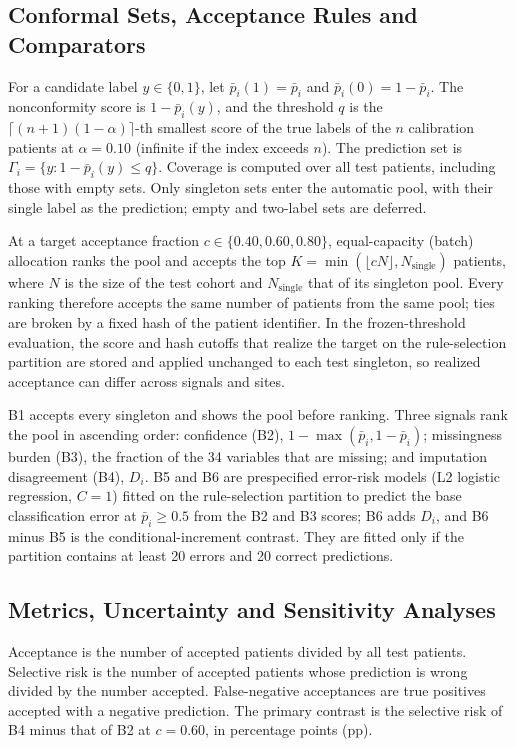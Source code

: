 \documentclass[conference]{IEEEtran}
\newcommand{\pmean}{\bar{p}}
\begin{document}
\subsection{Conformal Sets, Acceptance Rules and Comparators}
For a candidate label $y\in\{0,1\}$, let $\pmean_i(1)=\pmean_i$ and $\pmean_i(0)=1-\pmean_i$. The nonconformity score is $1-\pmean_i(y)$, and the threshold $q$ is the $\lceil (n+1)(1-\alpha)\rceil$-th smallest score of the true labels of the $n$ calibration patients at $\alpha=0.10$ (infinite if the index exceeds $n$). The prediction set is $\Gamma_i=\{y: 1-\pmean_i(y)\le q\}$. Coverage is computed over all test patients, including those with empty sets. Only singleton sets enter the automatic pool, with their single label as the prediction; empty and two-label sets are deferred.

At a target acceptance fraction $c\in\{0.40, 0.60, 0.80\}$, equal-capacity (batch) allocation ranks the pool and accepts the top $K=\min(\lfloor cN\rfloor, N_{\mathrm{single}})$ patients, where $N$ is the size of the test cohort and $N_{\mathrm{single}}$ that of its singleton pool. Every ranking therefore accepts the same number of patients from the same pool; ties are broken by a fixed hash of the patient identifier. In the frozen-threshold evaluation, the score and hash cutoffs that realize the target on the rule-selection partition are stored and applied unchanged to each test singleton, so realized acceptance can differ across signals and sites.

B1 accepts every singleton and shows the pool before ranking. Three signals rank the pool in ascending order: confidence (B2), $1-\max(\pmean_i, 1-\pmean_i)$; missingness burden (B3), the fraction of the 34 variables that are missing; and imputation disagreement (B4), $D_i$. B5 and B6 are prespecified error-risk models (L2 logistic regression, $C=1$) fitted on the rule-selection partition to predict the base classification error at $\pmean_i\ge 0.5$ from the B2 and B3 scores; B6 adds $D_i$, and B6 minus B5 is the conditional-increment contrast. They are fitted only if the partition contains at least 20 errors and 20 correct predictions.

\subsection{Metrics, Uncertainty and Sensitivity Analyses}
Acceptance is the number of accepted patients divided by all test patients. Selective risk is the number of accepted patients whose prediction is wrong divided by the number accepted. False-negative acceptances are true positives accepted with a negative prediction. The primary contrast is the selective risk of B4 minus that of B2 at $c=0.60$, in percentage points (pp).
\end{document}
